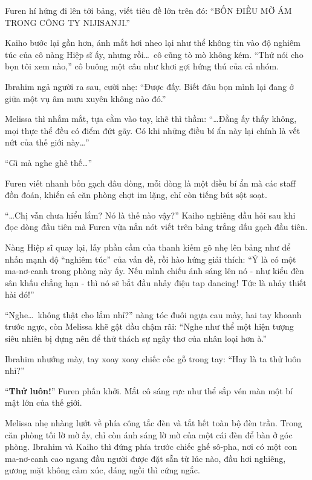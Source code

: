 \documentclass[../main.tex]{subfiles}
\begin{document}
\chrint

Furen hí hửng đi lên tới bảng, viết tiêu đề lớn trên đó: ``BỐN ĐIỀU MỜ ÁM TRONG CÔNG TY NIJISANJI.''

Kaiho bước lại gần hơn, ánh mắt hơi nheo lại như thể không tin vào độ nghiêm túc của cô nàng Hiệp sĩ ấy, nhưng rồi\dots\ cô cũng tò mò không kém. ``Thử nói cho bọn tôi xem nào,'' cô buông một câu như khơi gợi hứng thú của cả nhóm.

Ibrahim ngả người ra sau, cười nhẹ: ``Được đấy. Biết đâu bọn mình lại đang ở giữa một vụ âm mưu xuyên không nào đó.''

Melissa thì nhắm mắt, tựa cằm vào tay, khẽ thì thầm: ``\dots Đằng ấy thấy không, mọi thực thể đều có điểm đứt gãy. Có khi những điều bí ẩn này lại chính là vết nứt của thế giới này\dots''

``Gì mà nghe ghê thế\dots''

Furen viết nhanh bốn gạch đâu dòng, mỗi dòng là một điều bí ẩn mà các staff đồn đoán, khiến cả căn phòng chợt im lặng, chỉ còn tiếng bút sột soạt.


``\dots Chị vẫn chưa hiểu lắm? Nó là thế nào vậy?'' Kaiho nghiêng đầu hỏi sau khi đọc dòng đầu tiên mà Furen vừa nắn nót viết trên bảng trắng dấu gạch đầu tiên.

Nàng Hiệp sĩ quay lại, lấy phần cầm của thanh kiếm gõ nhẹ lên bảng như để nhấn mạnh độ ``nghiêm túc'' của vấn đề, rồi hào hứng giải thích: ``Ý là có một ma-nơ-canh trong phòng này ấy. Nếu mình chiếu ánh sáng lên nó - như kiểu đèn sân khấu chẳng hạn - thì nó sẽ bắt đầu nhảy điệu tap dancing! Tức là nhảy thiết hài đó!''

``Nghe\dots\ không thật cho lắm nhỉ?'' nàng tóc đuôi ngựa cau mày, hai tay khoanh trước ngực, còn Melissa khẽ gật đầu chậm rãi: ``Nghe như thể một hiện tượng siêu nhiên bị dựng nên để thử thách sự ngây thơ của nhân loại hơn à.''

Ibrahim nhướng mày, tay xoay xoay chiếc cốc gỗ trong tay: ``Hay là ta thử luôn nhỉ?''

``\textbf{Thử luôn!}'' Furen phấn khởi. Mắt cô sáng rực như thể sắp vén màn một bí mật lớn của thế giới.

\ct

Melissa nhẹ nhàng lướt về phía công tắc đèn và tắt hết toàn bộ đèn trần. Trong căn phòng tối lờ mờ ấy, chỉ còn ánh sáng lờ mờ của một cái đèn để bàn ở góc phòng. Ibrahim và Kaiho thì đứng phía trước chiếc ghế sô-pha, nơi có một con ma-nơ-canh cao ngang đầu người được đặt sẵn từ lúc nào, đầu hơi nghiêng, gương mặt không cảm xúc, dáng ngồi thì cứng ngắc.
\end{document}
